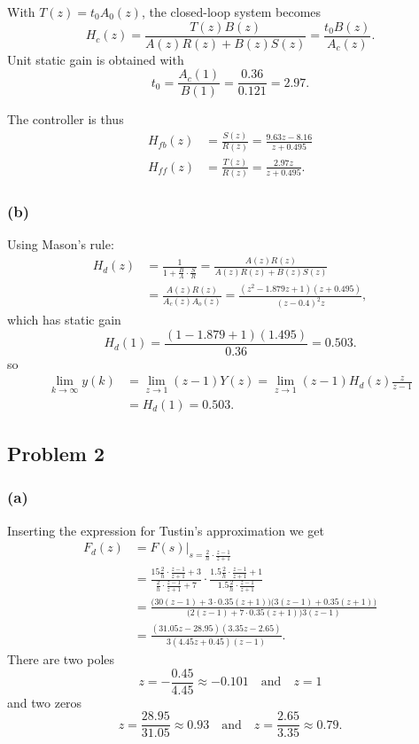 \documentclass[letterpaper,12pt]{article}
\begin{document}
With $T(z) = t_0 A_0(z)$, the closed-loop system becomes
\[ H_c(z) = \frac{T(z)B(z)}{A(z)R(z) + B(z)S(z)} =   \frac{t_0B(z)}{A_c(z)}. \]
Unit static gain is obtained with 
\[ t_0 = \frac{A_c(1)}{B(1)} = \frac{0.36}{0.121} = 2.97. \]

The controller is thus
\begin{align*}
H_{fb}(z) &= \frac{S(z)}{R(z)} = \frac{9.63z - 8.16}{z + 0.495}\\
H_{ff}(z) &= \frac{T(z)}{R(z)} = \frac{2.97z}{z + 0.495}. 
\end{align*}

\subsubsection*{(b)}
Using Mason's rule:
\begin{equation*}
\begin{split}
 H_d(z) &= \frac{1}{1 + \frac{B}{A}\cdot\frac{S}{R}} = \frac{A(z)R(z)}{A(z)R(z) + B(z)S(z)} \\
        &= \frac{A(z)R(z)}{A_c(z)A_o(z)} = \frac{(z^2 - 1.879z + 1)(z + 0.495)}{(z-0.4)^2z},
      \end{split}
\end{equation*}
which has static gain
\[ H_d(1) = \frac{(1 - 1.879 + 1)(1.495)}{0.36} = 0.503.\]
so
\begin{equation*}
\begin{split}
\lim_{k\to\infty} y(k) &= \lim_{z\to 1} (z-1) Y(z) = \lim_{z\to 1} (z-1) H_d(z) \frac{z}{z-1}\\
 &= H_d(1) = 0.503. 
\end{split}
\end{equation*}

\subsection*{Problem 2}

\subsubsection*{(a)}

Inserting the expression for Tustin's approximation we get
\begin{equation*}
\begin{split}
F_d(z) &= F(s)|_{s = \frac{2}{h}\cdot\frac{z-1}{z+1}} \\
 &= \frac{ 15 \frac{2}{h}\cdot\frac{z-1}{z+1} + 3}{ \frac{2}{h}\cdot\frac{z-1}{z+1} + 7 } \cdot \frac{1.5\frac{2}{h}\cdot\frac{z-1}{z+1} + 1}{ 1.5\frac{2}{h}\cdot\frac{z-1}{z+1} } \\
&= \frac{\big(30(z-1) + 3\cdot 0.35(z+1)\big) \big( 3(z-1) + 0.35(z+1)\big)}{\big(2(z-1) + 7\cdot 0.35(z+1)\big)3(z-1)}\\
&= \frac{(31.05z -28.95)(3.35z - 2.65)}{3(4.45z + 0.45)(z-1)}.
\end{split}
\end{equation*}
There are two poles
\[ z = -\frac{0.45}{4.45} \approx -0.101 \quad \text{and} \quad z = 1\]
and two zeros
\[ z = \frac{28.95}{31.05} \approx 0.93 \quad \text{and} \quad z = \frac{2.65}{3.35} \approx 0.79. \]
\end{document}
